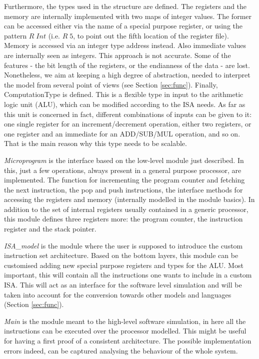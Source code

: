 \documentclass[conference]{IEEEtran}
\begin{document}
Furthermore, the types used in the structure are defined.
The registers and the memory are internally implemented with two maps of integer values.
The former can be accessed either via the name of a
special purpose register, or using the pattern $R \; Int$ (i.e. $R \; 5$, to point out the
fifth location of the register file). Memory is accessed via an integer type address instead.
Also immediate values are internally seen as integers. This approach is not
accurate. Some of the features - the bit length of the registers, or the
endianness of the data - are lost. Nonetheless, we aim at keeping a high degree of
abstraction, needed to interpret the model from several point of views (see Section
\ref{sec:func}).
Finally, ComputationType is defined. This is a flexible type in input to the
arithmetic logic unit (ALU), which can be modified according to the ISA
needs. As far as this unit is concerned in fact, different combinations of inputs can be
given to it: one single register for an increment/decrement operation, either two 
registers, or one register and an immediate for an ADD/SUB/MUL operation, and so on.
That is the main reason why this type needs to be scalable.

\textit{Microprogram} is the interface based on the low-level module just described.
In this, just a few operations, always present in a general purpose processor, are
implemented. The function for incrementing the program counter and fetching
the next instruction, the pop and push instructions, the interface methods for accessing
the registers and memory (internally modelled in the module basics).
In addition to the set of internal registers usually contained in a generic processor,
this module defines three registers more: the program counter, the instruction register and
the stack pointer.

\textit{ISA\_model} is the module where the user is supposed to introduce the custom 
instruction set architecture. Based on the bottom layers, this
module can be customised adding new special purpose registers and types for the ALU.
Most important, this will contain all the instructions one wants to include in a custom ISA. This will act as an interface for the software level simulation and will be taken into
account for the conversion towards other models and languages (Section \ref{sec:func}).

\textit{Main} is the module meant to the high-level software simulation, in here
all the instructions can be executed over the processor modelled. This might be useful
for having a first proof of a consistent architecture. The possible implementation errors
indeed, can be captured analysing the behaviour of the whole system.
\end{document}
